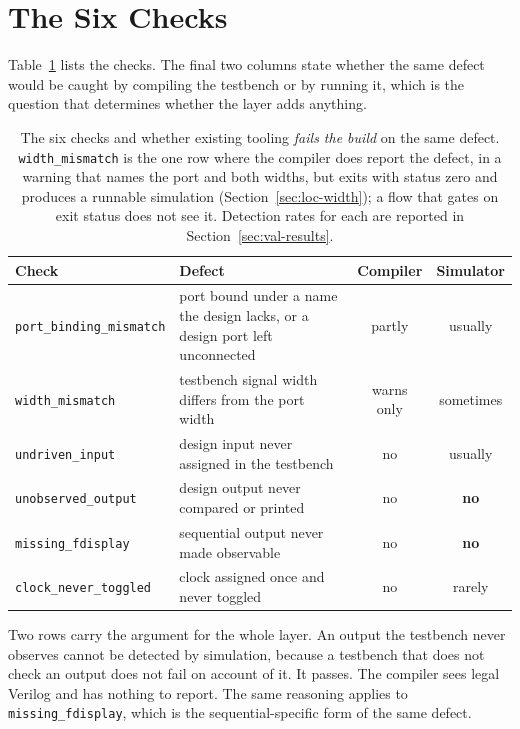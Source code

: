 \documentclass[11pt,a4paper,titlepage=false]{scrreprt}
\begin{document}
\section{The Six Checks}\label{sec:loc-checks}

Table~\ref{tab:checks} lists the checks. The final two columns state whether the same
defect would be caught by compiling the testbench or by running it, which is the question
that determines whether the layer adds anything.

\begin{table}[H]
\centering
\small
\begin{tabular}{@{}l p{5.4cm} c c@{}}
\toprule
\textbf{Check} & \textbf{Defect} & \textbf{Compiler} & \textbf{Simulator} \\
\midrule
\texttt{port\_binding\_mismatch} & port bound under a name the design lacks, or a design
port left unconnected & partly & usually \\
\texttt{width\_mismatch} & testbench signal width differs from the port width & warns only & sometimes \\
\texttt{undriven\_input} & design input never assigned in the testbench & no & usually \\
\texttt{unobserved\_output} & design output never compared or printed & no & \textbf{no} \\
\texttt{missing\_fdisplay} & sequential output never made observable & no & \textbf{no} \\
\texttt{clock\_never\_toggled} & clock assigned once and never toggled & no & rarely \\
\bottomrule
\end{tabular}
\caption{The six checks and whether existing tooling \emph{fails the build} on the same
defect. \texttt{width\_mismatch} is the one row where the compiler does report the defect,
in a warning that names the port and both widths, but exits with status zero and produces a
runnable simulation (Section~\ref{sec:loc-width}); a flow that gates on exit status does not
see it. Detection rates for each are reported in Section~\ref{sec:val-results}.}
\label{tab:checks}
\end{table}

Two rows carry the argument for the whole layer. An output the testbench never observes
cannot be detected by simulation, because a testbench that does not check an output does
not fail on account of it. It passes. The compiler sees legal Verilog and has nothing to
report. The same reasoning applies to \texttt{missing\_fdisplay}, which is the
sequential-specific form of the same defect.
\end{document}
